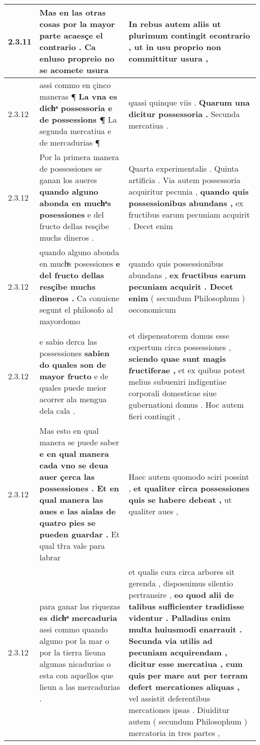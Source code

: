 \begin{tabular}{|p{1cm}|p{6.5cm}|p{6.5cm}|}
2.3.11 & Mas en las otras cosas \textbf{ por la mayor parte acaesçe el contrario . } Ca enluso propreio no se acomete usura & In rebus autem aliis \textbf{ ut plurimum contingit econtrario , } ut in usu proprio non committitur usura , \\\hline
2.3.12 & assi commo en çinco maneras ¶ \textbf{ La vna es dichͣ possessoria e de possessions ¶ } La segunda mercatiua e de mercadurias ¶ & quasi quinque viis . \textbf{ Quarum una dicitur possessoria . } Secunda mercatiua . \\\hline
2.3.12 & Por la primera manera de possessiones se ganan los aueres \textbf{ quando alguno abonda en muchͣs posessiones } e del fructo dellas resçibe muchs dineros . & Quarta experimentalis . Quinta artificia . Via autem possessoria acquiritur pecunia , \textbf{ quando quis possessionibus abundans , } ex fructibus earum pecuniam acquirit . Decet enim \\\hline
2.3.12 & quando alguno abonda en muchͣs posessiones \textbf{ e del fructo dellas resçibe muchs dineros . } Ca conuiene segunt el philosofo al mayordomo & quando quis possessionibus abundans , \textbf{ ex fructibus earum pecuniam acquirit . Decet enim } ( secundum Philosophum ) oeconomicum \\\hline
2.3.12 & e sabio derca las possessiones \textbf{ sabien do quales son de mayor fructo } e de quales puede meior acorrer ala mengua dela cala . & et dispensatorem domus esse expertum circa possessiones , \textbf{ sciendo quae sunt magis fructiferae , } et ex quibus potest melius subueniri indigentiae corporali domesticae siue gubernationi domus . Hoc autem fieri contingit , \\\hline
2.3.12 & Mas esto en qual manera se puede saber \textbf{ e en qual manera cada vno se deua auer çerca las possessiones . Et en qual manera las aues e las aialas de quatro pies se pueden guardar . } Et qual tr̃ra vale para labrar & Haec autem quomodo sciri possint , \textbf{ et qualiter circa possessiones quis se habere debeat , } ut qualiter aues , \\\hline
2.3.12 & para ganar las riquezas \textbf{ es dichͣ mercaduria } assi commo quando alguno por la mar o por la tierra lieuna algunas nicadurias o esta con aquellos que lieun a las mercadurias . & et qualis cura circa arbores sit gerenda , disposuimus silentio pertransire , \textbf{ eo quod alii de talibus sufficienter tradidisse videntur . Palladius enim multa huiusmodi enarrauit . Secunda via utilis ad pecuniam acquirendam , dicitur esse mercatiua , cum quis per mare aut per terram defert mercationes aliquas , } vel assistit deferentibus mercationes ipsas . Diuiditur autem ( secundum Philosophum ) mercatoria in tres partes , \\\hline

\end{tabular}
